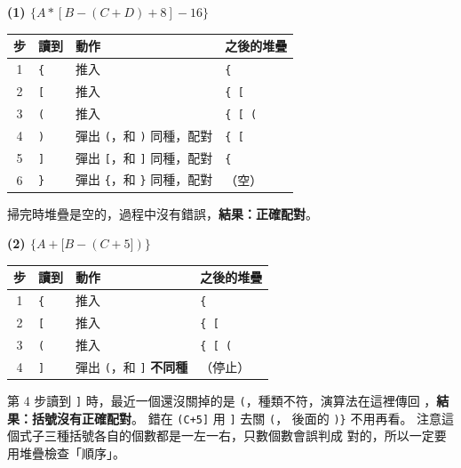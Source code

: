 \begin{pastsoln}
\textbf{(1) $\{A*[B-(C+D)+8]-16\}$}
\begin{center}
\small
\begin{tabular}{clll}
\toprule
步 & 讀到 & 動作 & 之後的堆疊 \\
\midrule
1 & \texttt{\{} & 推入 & \texttt{\{} \\
2 & \texttt{[} & 推入 & \texttt{\{ [} \\
3 & \texttt{(} & 推入 & \texttt{\{ [ (} \\
4 & \texttt{)} & 彈出 \texttt{(}，和 \texttt{)} 同種，配對 & \texttt{\{ [} \\
5 & \texttt{]} & 彈出 \texttt{[}，和 \texttt{]} 同種，配對 & \texttt{\{} \\
6 & \texttt{\}} & 彈出 \texttt{\{}，和 \texttt{\}} 同種，配對 & （空） \\
\bottomrule
\end{tabular}
\end{center}
掃完時堆疊是空的，過程中沒有錯誤，\textbf{結果：正確配對}。

\textbf{(2) $\{A+[B-(C+5])\}$}
\begin{center}
\small
\begin{tabular}{clll}
\toprule
步 & 讀到 & 動作 & 之後的堆疊 \\
\midrule
1 & \texttt{\{} & 推入 & \texttt{\{} \\
2 & \texttt{[} & 推入 & \texttt{\{ [} \\
3 & \texttt{(} & 推入 & \texttt{\{ [ (} \\
4 & \texttt{]} & 彈出 \texttt{(}，和 \texttt{]} \textbf{不同種} & （停止） \\
\bottomrule
\end{tabular}
\end{center}
第 4 步讀到 \texttt{]} 時，最近一個還沒關掉的是 \texttt{(}，種類不符，演算法在這裡傳回
\FALSE，\textbf{結果：括號沒有正確配對}。 錯在 \texttt{(C+5]} 用 \texttt{]} 去關 \texttt{(}，
後面的 \texttt{)\}} 不用再看。 注意這個式子三種括號各自的個數都是一左一右，只數個數會誤判成
對的，所以一定要用堆疊檢查「順序」。
\end{pastsoln}

